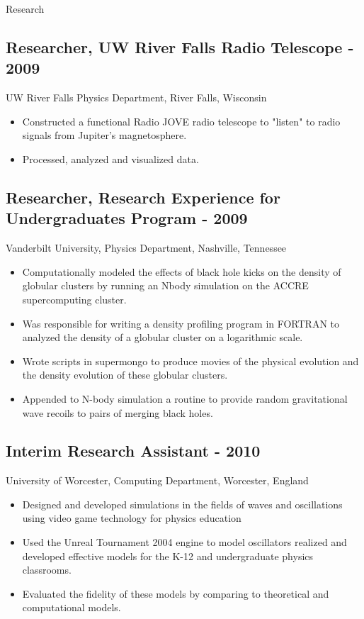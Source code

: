 \documentclass{resume} %
\begin{document}
\begin{rSection}{Research}
\subsection*{Researcher, UW River Falls Radio Telescope - 2009}
UW River Falls Physics Department, River Falls, Wisconsin
\begin{itemize}
    \item Constructed a functional Radio JOVE radio telescope to "listen" to
            radio signals from Jupiter's magnetosphere.
    \item Processed, analyzed and visualized data.
\end{itemize}

\subsection*{Researcher, Research Experience for Undergraduates Program - 2009}
Vanderbilt University, Physics Department, Nashville, Tennessee
\begin{itemize}
    \item Computationally modeled the effects of black hole kicks on the
    density of globular clusters by running an Nbody simulation on the ACCRE
    supercomputing cluster.
    \item Was responsible for writing a density profiling program in FORTRAN to
    analyzed the density of a globular cluster on a logarithmic scale.
    \item Wrote scripts in supermongo to produce movies of the physical evolution
    and the density evolution of these globular clusters.
    \item Appended to N-body simulation a routine to provide random gravitational wave
    recoils to pairs of merging black holes.
\end{itemize}

\subsection*{Interim Research Assistant - 2010}
University of Worcester, Computing Department, Worcester, England
\begin{itemize}
    \item Designed and developed simulations in the fields of waves and
    oscillations using video game technology for physics education
    \item Used the Unreal Tournament 2004 engine to model oscillators
    realized and developed effective models for the K-12
    and undergraduate physics classrooms.
    \item Evaluated the fidelity of these models by comparing to theoretical and
    computational models.
\end{itemize}


\end{rSection}
\end{document}
